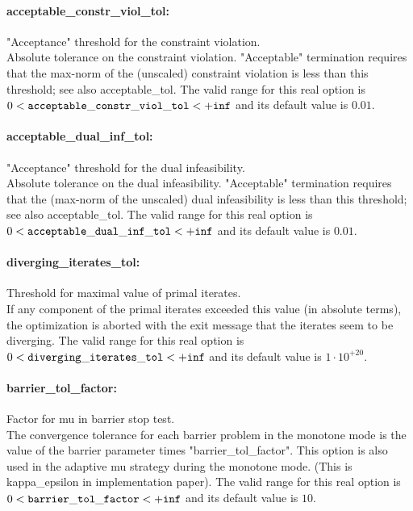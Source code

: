\paragraph{acceptable\_constr\_viol\_tol:} "Acceptance" threshold for the constraint violation. $\;$ \\
 Absolute tolerance on the constraint violation.
"Acceptable" termination requires that the
max-norm of the (unscaled) constraint violation
is less than this threshold; see also
acceptable\_tol. The valid range for this real option is 
$0 <  {\tt acceptable\_constr\_viol\_tol } <  {\tt +inf}$
and its default value is $0.01$.


\paragraph{acceptable\_dual\_inf\_tol:} "Acceptance" threshold for the dual infeasibility. $\;$ \\
 Absolute tolerance on the dual infeasibility.
"Acceptable" termination requires that the
(max-norm of the unscaled) dual infeasibility is
less than this threshold; see also
acceptable\_tol. The valid range for this real option is 
$0 <  {\tt acceptable\_dual\_inf\_tol } <  {\tt +inf}$
and its default value is $0.01$.


\paragraph{diverging\_iterates\_tol:} Threshold for maximal value of primal iterates. $\;$ \\
 If any component of the primal iterates exceeded
this value (in absolute terms), the optimization
is aborted with the exit message that the
iterates seem to be diverging. The valid range for this real option is 
$0 <  {\tt diverging\_iterates\_tol } <  {\tt +inf}$
and its default value is $1 \cdot 10^{+20}$.


\paragraph{barrier\_tol\_factor:} Factor for mu in barrier stop test. $\;$ \\
 The convergence tolerance for each barrier
problem in the monotone mode is the value of the
barrier parameter times "barrier\_tol\_factor".
This option is also used in the adaptive mu
strategy during the monotone mode. (This is
kappa\_epsilon in implementation paper). The valid range for this real option is 
$0 <  {\tt barrier\_tol\_factor } <  {\tt +inf}$
and its default value is $10$.

